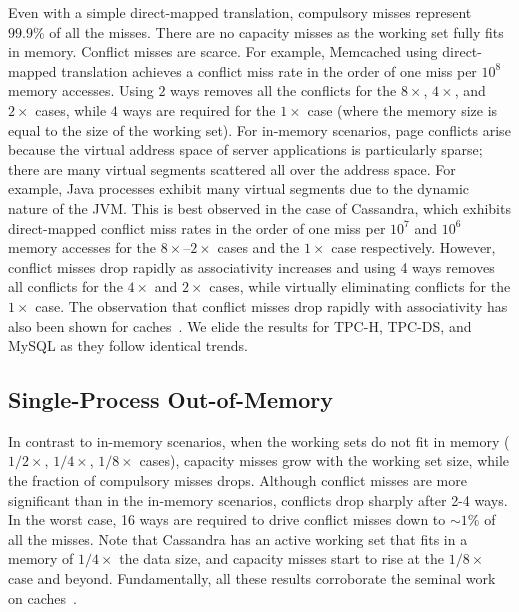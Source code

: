 Even with a simple direct-mapped translation, compulsory misses represent $99.9\%$ of all the misses. There are no capacity misses as the working set fully fits in memory. Conflict misses are scarce. For example, Memcached using direct-mapped translation achieves a conflict miss rate in the order of one miss per $10^{8}$ memory accesses. Using $2$ ways removes all the conflicts for the $8\times$, $4\times$, and $2\times$ cases, while $4$ ways are required for the $1\times$ case (where the memory size is equal to the size of the working set). For in-memory scenarios, page conflicts arise because the virtual address space of server applications is particularly sparse; there are many virtual segments scattered all over the address space. For example, Java processes exhibit many virtual segments due to the dynamic nature of the JVM. This is best observed in the case of Cassandra, which exhibits direct-mapped conflict miss rates in the order of one miss per $10^{7}$ and $10^{6}$ memory accesses for the $8\times$--$2\times$ cases and the $1\times$ case respectively. However, conflict misses drop rapidly as associativity increases and using 4 ways removes all conflicts for the $4\times$ and $2\times$ cases, while virtually eliminating conflicts for the $1\times$ case. The observation that conflict misses drop rapidly with associativity has also been shown for caches~\cite{hill:aspects, cantin:cache}. We elide the results for TPC-H, TPC-DS, and MySQL as they follow identical trends.

\subsection{Single-Process Out-of-Memory}

In contrast to in-memory scenarios, when the working sets do not fit in memory ($1/2\times$, $1/4\times$, $1/8\times$ cases), capacity misses grow with the working set size, while the fraction of compulsory misses drops. Although conflict misses are more significant than in the in-memory scenarios, conflicts drop sharply after 2-4 ways. In the worst case, 16 ways are required to drive conflict misses down to $\sim1\%$ of all the misses. Note that Cassandra has an active working set that fits in a memory of $1/4\times$ the data size, and capacity misses start to rise at the $1/8\times$ case and beyond. Fundamentally, all these results corroborate the seminal work on caches~\cite{hill:aspects, cantin:cache}. 

